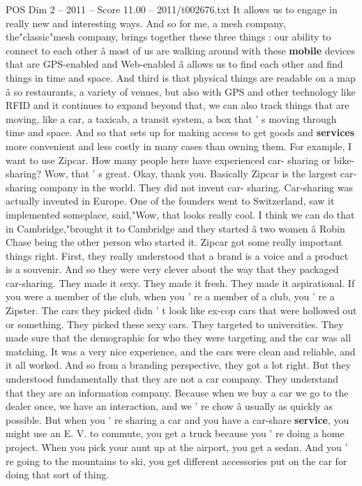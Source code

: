 \begin{textsample}{POS Dim 2 – 2011 – Score 11.00 – 2011/t002676.txt}
It allows us to engage in really new and interesting ways.
And so for me, a mesh company, the"classic"mesh company, brings together these three things : our ability to connect to each other â most of us are walking around with these \textbf{mobile} devices that are GPS-enabled and Web-enabled â allows us to find each other and find things in time and space.
And third is that physical things are readable on a map â so restaurants, a variety of venues, but also with GPS and other technology like RFID and it continues to expand beyond that, we can also track things that are moving, like a car, a taxicab, a transit system, a box that ' s moving through time and space.
And so that sets up for making access to get goods and \textbf{services} more convenient and less costly in many cases than owning them.
For example, I want to use Zipcar.
How many people here have experienced car- sharing or bike-sharing?
Wow, that ' s great.
Okay, thank you.
Basically Zipcar is the largest car-sharing company in the world.
They did not invent car- sharing.
Car-sharing was actually invented in Europe.
One of the founders went to Switzerland, saw it implemented someplace, said,"Wow, that looks really cool.
I think we can do that in Cambridge,"brought it to Cambridge and they started â two women â Robin Chase being the other person who started it.
Zipcar got some really important things right.
First, they really understood that a brand is a voice and a product is a souvenir.
And so they were very clever about the way that they packaged car-sharing.
They made it sexy.
They made it fresh.
They made it aspirational.
If you were a member of the club, when you ' re a member of a club, you ' re a Zipster.
The cars they picked didn ' t look like ex-cop cars that were hollowed out or something.
They picked these sexy cars.
They targeted to universities.
They made sure that the demographic for who they were targeting and the car was all matching.
It was a very nice experience, and the cars were clean and reliable, and it all worked.
And so from a branding perspective, they got a lot right.
But they understood fundamentally that they are not a car company.
They understand that they are an information company.
Because when we buy a car we go to the dealer once, we have an interaction, and we ' re chow â usually as quickly as possible.
But when you ' re sharing a car and you have a car-share \textbf{service}, you might use an E.
V. to commute, you get a truck because you ' re doing a home project.
When you pick your aunt up at the airport, you get a sedan.
And you ' re going to the mountains to ski, you get different accessories put on the car for doing that sort of thing.

\end{textsample}
